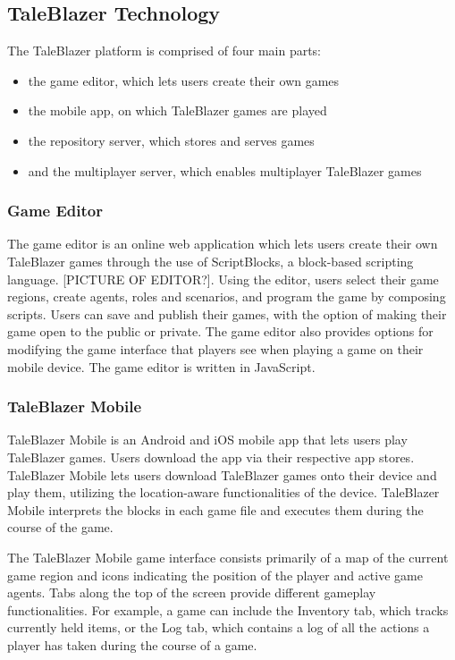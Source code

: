 \subsection{TaleBlazer Technology}

The TaleBlazer platform is comprised of four main parts:
	\begin{itemize}
 		\item the game editor, which lets users create their own games
 		\item the mobile app, on which TaleBlazer games are played
 		\item the repository server, which stores and serves games
 		\item and the multiplayer server, which enables multiplayer TaleBlazer games
 	\end{itemize}

\subsubsection{Game Editor}
The game editor is an online web application which lets users create their own TaleBlazer games through the use of ScriptBlocks, a block-based scripting language. [PICTURE OF EDITOR?]. Using the editor, users select their game regions, create agents, roles and scenarios, and program the game by composing scripts. Users can save and publish their games, with the option of making their game open to the public or private. The game editor also provides options for modifying the game interface that players see when playing a game on their mobile device. The game editor is written in JavaScript. 

\subsubsection{TaleBlazer Mobile}

TaleBlazer Mobile is an Android and iOS mobile app that lets users play TaleBlazer games. Users download the app via their respective app stores. TaleBlazer Mobile lets users download TaleBlazer games onto their device and play them, utilizing the location-aware functionalities of the device. TaleBlazer Mobile interprets the blocks in each game file and executes them during the course of the game.

The TaleBlazer Mobile game interface consists primarily of a map of the current game region and icons indicating the position of the player and active game agents. Tabs along the top of the screen provide different gameplay functionalities. For example, a game can include the Inventory tab, which tracks currently held items, or the Log tab, which contains a log of all the actions a player has taken during the course of a game.

